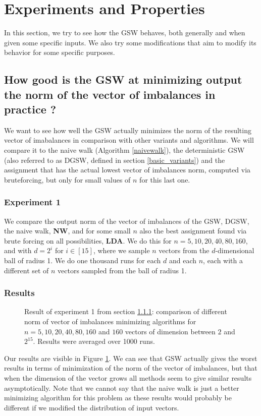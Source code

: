 \documentclass[12pt]{article}
\begin{document}
\section{Experiments and Properties}\label{exp_and_prop}
In this section, we try to see how the GSW behaves, both generally and when given some specific inputs. We also try some modifications that aim to modify its behavior for some specific purposes.

\subsection{How good is the GSW at minimizing output the norm of the vector of imbalances in practice ?}
We want to see how well the GSW actually minimizes the norm of the resulting vector of imabalances in comparison with other variants and algorithms. We will compare it to the naive walk (Algorithm \ref{naivewalk}), the deterministic GSW (also referred to as DGSW, defined in section \ref{basic_variants}) and the assignment that has the actual lowest vector of imbalances norm, computed via bruteforcing, but only for small values of $n$ for this last one.

\subsubsection{Experiment 1}\label{how_good_at_minimizing_disc}
We compare the output norm of the vector of imbalances of the GSW, DGSW, the naive walk, \textbf{NW}, and for some small $n$ also the best assignment found via brute forcing on all possibilities, \textbf{LDA}. We do this for $n=5,10,20,40,80,160$, and with $d=2^i$ for $i\in[15]$, where we sample $n$ vectors from the $d$-dimensional ball of radius 1. We do one thousand runs for each $d$ and each $n$, each with a different set of $n$ vectors sampled from the ball of radius 1.

\subsubsection{Results}
\begin{figure}
\centering

\caption{Result of experiment 1 from section \ref{how_good_at_minimizing_disc}: comparison of different norm of vector of imbalances minimizing algorithms for $n=5,10,20,40,80,160$ and $160$ vectors of dimension between $2$ and $2^{15}$. Results were averaged over 1000 runs.}\label{output_disc}
\end{figure}
Our results are visible in Figure \ref{output_disc}. We can see that GSW actually gives the worst results in terms of minimization of the norm of the vector of imbalances, but that when the dimension of the vector grows all methods seem to give similar results asymptotically. Note that we cannot say that the naive walk is just a better minimizing algorithm for this problem as these results would probably be different if we modified the distribution of input vectors.
\end{document}
